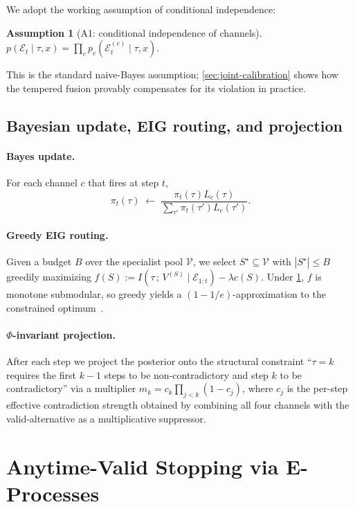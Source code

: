 \documentclass[11pt,a4paper]{article}
\newcommand{\Ecal}{\mathcal{E}}
\newcommand{\Vcal}{\mathcal{V}}
\theoremstyle{plain}
\theoremstyle{definition}
\newtheorem{assumption}[theorem]{Assumption}
\theoremstyle{remark}
\begin{document}
We adopt the working assumption of conditional independence:
\begin{assumption}[A1: conditional independence of channels]
\label{ass:cond-indep}
$p(\Ecal_t \mid \tau, x) = \prod_c p_c(\Ecal_t^{(c)} \mid \tau, x)$.
\end{assumption}
This is the standard naive-Bayes assumption;
\cref{sec:joint-calibration} shows how the tempered fusion provably
compensates for its violation in practice.

\subsection{Bayesian update, EIG routing, and projection}

\paragraph{Bayes update.}
For each channel $c$ that fires at step $t$,
\begin{equation}
\pi_t(\tau)
  \;\leftarrow\;
  \frac{\pi_t(\tau) L_c(\tau)}{\sum_{\tau'} \pi_t(\tau') L_c(\tau')}.
\end{equation}

\paragraph{Greedy EIG routing.}
Given a budget $B$ over the specialist pool $\Vcal$, we select
$S^\star \subseteq \Vcal$ with $|S^\star| \leq B$ greedily maximizing
$f(S) := I(\tau\,;\,V^{(S)} \mid \Ecal_{1:t}) - \lambda c(S)$.
Under \cref{ass:cond-indep}, $f$ is monotone submodular, so greedy
yields a $(1-1/e)$-approximation to the constrained
optimum~\citep{nemhauser1978analysis}.

\paragraph{$\Phi$-invariant projection.}
After each step we project the posterior onto the structural
constraint ``$\tau{=}k$ requires the first $k{-}1$ steps to be
non-contradictory and step $k$ to be contradictory'' via a multiplier
$m_k = c_k \prod_{j<k}(1-c_j)$, where $c_j$ is the per-step effective
contradiction strength obtained by combining all four channels with
the valid-alternative as a multiplicative suppressor.

\section{Anytime-Valid Stopping via E-Processes}
\label{sec:eprocess}
\end{document}
